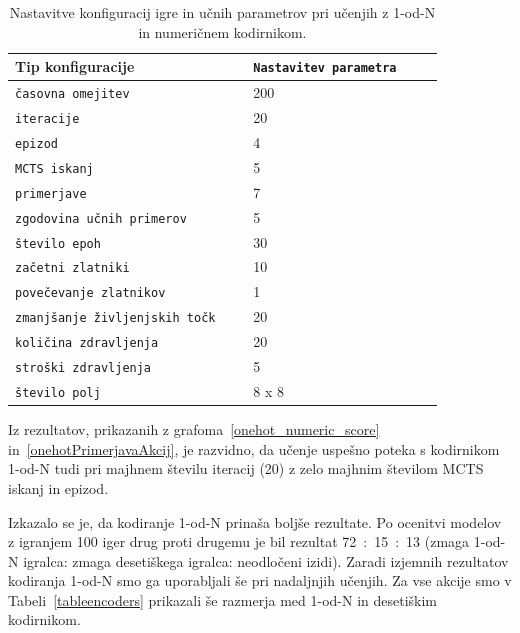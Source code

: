 \documentclass[a4paper, 12pt]{book}
\begin{document}
{\begin{table}
	\begin{center}
		\begin{tabular}{p{0.5\linewidth}|p{0.4\linewidth}}
			Tip konfiguracije                          & {\tt Nastavitev parametra} \\ \hline
			{\tt časovna omejitev}                     & 200                        \\
			{\tt iteracije}                            & 20                         \\
			{\tt epizod}                               & 4                          \\
			{\tt MCTS iskanj}                          & 5                          \\
			{\tt primerjave}                           & 7                          \\
			{\tt zgodovina učnih primerov}             & 5                          \\
			{\tt število epoh}                         & 30                         \\
			{\tt začetni zlatniki}                     & 10                         \\
			{\tt povečevanje zlatnikov}                & 1                          \\
			{\tt zmanjšanje življenjskih točk}         & 20                         \\
			{\tt količina zdravljenja}                 & 20                         \\
			{\tt stroški zdravljenja}                  & 5                          \\
			{\tt število polj}                         & 8 x 8                      \\	
		\end{tabular}
	\end{center}
	\caption{Nastavitve konfiguracij igre in učnih parametrov pri učenjih z 1-od-N in numeričnem kodirnikom.}
	\label{tableCompareOneHotNumeric}
\end{table}

Iz rezultatov, prikazanih z grafoma~\ref{onehot_numeric_score} in~\ref{onehotPrimerjavaAkcij}, je razvidno, da učenje uspešno poteka s kodirnikom 1-od-N tudi pri majhnem številu iteracij (20) z zelo majhnim številom MCTS iskanj in epizod.

Izkazalo se je, da kodiranje 1-od-N prinaša boljše rezultate.
Po ocenitvi modelov z igranjem 100 iger drug proti drugemu je bil rezultat 72~:~15~:~13 (zmaga 1-od-N igralca: zmaga desetiškega igralca: neodločeni izidi).
Zaradi izjemnih rezultatov kodiranja 1-od-N smo ga uporabljali še pri nadaljnjih učenjih.
Za vse akcije smo v Tabeli~\ref{tableencoders} prikazali še razmerja med 1-od-N in desetiškim kodirnikom.

}
\end{document}
